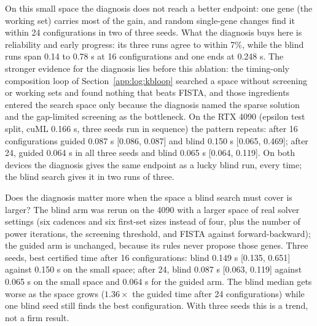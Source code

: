 \documentclass[11pt]{article}
\begin{document}
On this small space the diagnosis does not reach a better endpoint: one gene
(the working set) carries most of the gain, and random single-gene changes find
it within 24 configurations in two of three seeds. What the diagnosis buys here
is reliability and early progress: its three runs agree to within 7\%, while the
blind runs span 0.14 to 0.78 s at 16 configurations and one ends at 0.248 s. The
stronger evidence for the diagnosis lies before this ablation: the timing-only
composition loop of Section~\ref{app:log:kbloop} searched a space without
screening or working sets and found nothing that beats FISTA, and those
ingredients entered the search space only because the diagnosis named the
sparse solution and the gap-limited screening as the bottleneck. On the RTX 4090
(epsilon test split, cuML 0.166 s, three seeds run in sequence) the pattern
repeats: after 16 configurations guided 0.087 s [0.086, 0.087] and blind
0.150 s [0.065, 0.469]; after 24, guided 0.064 s in all three seeds and blind
0.065 s [0.064, 0.119]. On both devices the diagnosis gives the same endpoint
as a lucky blind run, every time; the blind search gives it in two runs of three.

Does the diagnosis matter more when the space a blind search must cover is
larger? The blind arm was rerun on the 4090 with a larger space of real solver
settings (six cadences and six first-set sizes instead of four, plus the number
of power iterations, the screening threshold, and FISTA against
forward-backward); the guided arm is unchanged, because its rules never propose
those genes. Three seeds, best certified time after 16 configurations: blind
0.149 s [0.135, 0.651] against 0.150 s on the small space; after 24, blind 0.087 s
[0.063, 0.119] against 0.065 s on the small space and 0.064 s for the guided arm.
The blind median gets worse as the space grows ($1.36\times$ the guided time after
24 configurations) while one blind seed still finds the best configuration. With
three seeds this is a trend, not a firm result.
\end{document}
